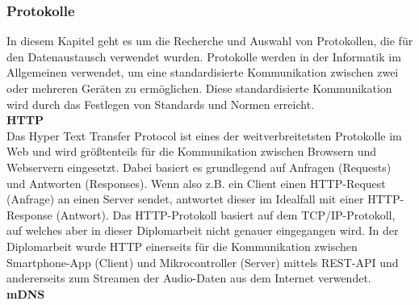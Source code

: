 \documentclass[11pt, twoside]{article}
\begin{document}
\subsubsection{Protokolle}
In diesem Kapitel geht es um die Recherche und Auswahl von Protokollen, die für den Datenaustausch verwendet wurden.
Protokolle werden in der Informatik im Allgemeinen verwendet, um eine standardisierte Kommunikation zwischen zwei oder mehreren Geräten zu ermöglichen. Diese standardisierte Kommunikation wird durch das Festlegen von Standards und Normen erreicht. \parencite[vgl.][]{noauthor_urlpi16_nodate}
\newline \\
\textbf{HTTP} \\
Das \glqq Hyper Text Transfer Protocol\grqq{} ist eines der weitverbreitetsten Protokolle im Web und wird größtenteils für die Kommunikation zwischen Browsern und Webservern eingesetzt. Dabei basiert es grundlegend auf Anfragen (Requests) und Antworten (Responses). Wenn also z.B. ein Client einen HTTP-Request (Anfrage) an einen Server sendet, antwortet dieser im Idealfall mit einer HTTP-Response (Antwort). Das HTTP-Protokoll basiert auf dem TCP/IP-Protokoll, auf welches aber in dieser Diplomarbeit nicht genauer eingegangen wird. In der Diplomarbeit wurde HTTP einerseits für die Kommunikation zwischen Smartphone-App (Client) und Mikrocontroller (Server) mittels REST-API und andererseits zum Streamen der Audio-Daten aus dem Internet verwendet. \parencite[vgl.][]{noauthor_urlpi01_2020}
\newline \\
\textbf{mDNS} \\
\end{document}
